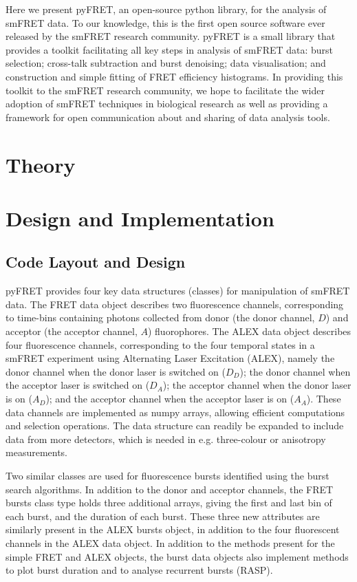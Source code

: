 Here we present pyFRET, an open-source python library, for the analysis of smFRET data. To our knowledge, this is the first open source software ever released by the smFRET research community. pyFRET is a small library that provides a toolkit facilitating all key steps in analysis of smFRET data: burst selection; cross-talk subtraction and burst denoising; data visualisation; and construction and simple fitting of FRET efficiency histograms. In providing this toolkit to the smFRET research community, we hope to facilitate the wider adoption of smFRET techniques in biological research as well as providing a framework for open communication about and sharing of data analysis tools.

\section{Theory}
\section*{Design and Implementation}
\subsection*{Code Layout and Design}
pyFRET provides four key data structures (classes) for manipulation of smFRET data. The FRET data object describes two fluorescence channels, corresponding to time-bins containing photons collected from donor (the donor channel, $D$) and acceptor (the acceptor channel, $A$) fluorophores. The ALEX data object describes four fluorescence channels, corresponding to the four temporal states in a smFRET experiment using Alternating Laser Excitation (ALEX), namely the donor channel when the donor laser is switched on ($D_D$); the donor channel when the acceptor laser is switched on ($D_A$); the acceptor channel when the donor laser is on ($A_D$); and the acceptor channel when the acceptor laser is on ($A_A$). These data channels are implemented as numpy arrays, allowing efficient computations and selection operations. The data structure can readily be expanded to include data from more detectors, which is needed in e.g. three-colour or anisotropy measurements.

Two similar classes are used for fluorescence bursts identified using the burst search algorithms. In addition to the donor and acceptor channels, the FRET bursts class type holds three additional arrays, giving the first and last bin of each burst, and the duration of each burst. These three new attributes are similarly present in the ALEX bursts object, in addition to the four fluorescent channels in the ALEX data object. In addition to the methods present for the simple FRET and ALEX objects, the burst data objects also implement methods to plot burst duration and to analyse recurrent bursts (RASP). 

